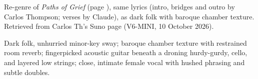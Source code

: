 
\begin{notes}
Re-genre of \emph{Paths of Grief} (page \pageref{sec:paths-of-grief}), same lyrics (intro, bridges and outro by Carlos Thompson; verses by Claude), as dark folk with baroque chamber texture. Retrieved from Carlos Th's Suno page (V6-MINI, 10 October 2026).
\end{notes}
\begin{style}
Dark folk, unhurried minor-key sway; baroque chamber texture with restrained room reverb; fingerpicked acoustic guitar beneath a droning hurdy-gurdy, cello, and layered low strings; close, intimate female vocal with hushed phrasing and subtle doubles.
\end{style}
